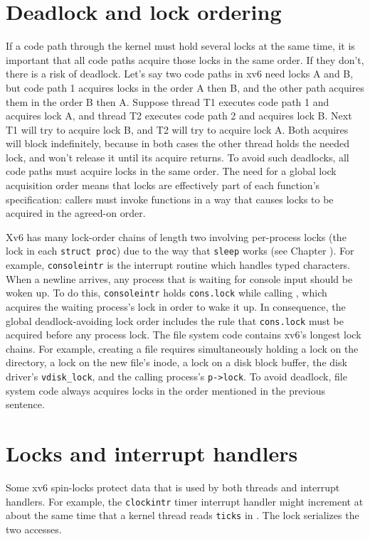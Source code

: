 \section{Deadlock and lock ordering}
If a code path through the kernel must hold several locks at the same time, it is
important that all code paths acquire those locks in the same order.  If
they don't, there is a risk of deadlock.  Let's say two code paths in
xv6 need locks A and B, but code path 1 acquires locks in the order A
then B, and the other path acquires them in the order B then A.
Suppose thread T1 executes code path 1 and acquires lock A,
and thread T2 executes code path 2 and acquires lock B.
Next T1 will try to acquire lock B, and T2 will try to acquire lock A.
Both acquires will block indefinitely, because in both cases the
other thread holds the needed lock, and won't release it until
its acquire returns.
To avoid such deadlocks, all code paths must acquire
locks in the same order. The need for a global lock acquisition order
means that locks are effectively part of each function's specification: 
callers must invoke functions in a way that causes locks to be acquired
in the agreed-on order.

Xv6 has many lock-order chains of length two involving
per-process locks
(the lock in each
\lstinline{struct proc})
due to the way that
\lstinline{sleep}
works (see Chapter
\*[CH:SCHED]).
For example,
\lstinline{consoleintr}
is the interrupt routine which handles typed characters.
When a newline arrives, any process that is waiting for
console input should be woken up.
To do this,
\lstinline{consoleintr}
holds
\lstinline{cons.lock}
while calling 
,
which acquires 
the waiting process's lock in order to wake it up.
In consequence, the global deadlock-avoiding
lock order includes the rule that
\lstinline{cons.lock}
must be acquired before any process lock.
The file system code contains xv6's longest lock chains.
For example, creating a file requires simultaneously
holding a lock on the directory, a lock on the new file's inode,
a lock on a disk block buffer, 
the disk driver's \lstinline{vdisk_lock},
and
the calling process's \lstinline{p->lock}.
To avoid deadlock, file system code always acquires locks in the order 
mentioned in the previous sentence.
\section{Locks and interrupt handlers}
Some xv6 spin-locks protect data that is used by
both threads and interrupt handlers.
For example, the
\lstinline{clockintr}
timer interrupt handler might increment
at about the same time that a kernel
thread reads
\lstinline{ticks} 
in
.
The lock
serializes the two accesses.

